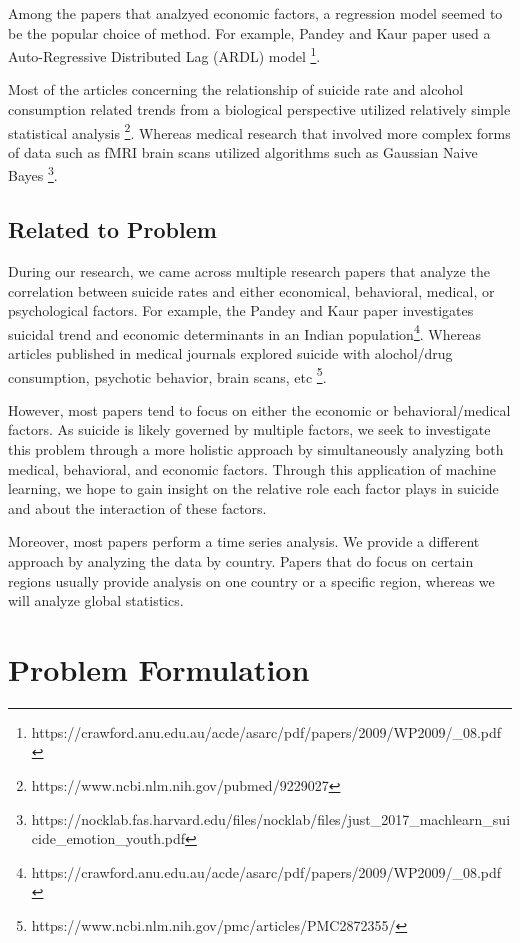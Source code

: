 \documentclass{article}
\begin{document}
\begin{multicols}{2}
Among the papers that analzyed economic factors, a regression model seemed to be the popular choice of method. For example, Pandey and Kaur paper used a Auto-Regressive Distributed Lag (ARDL) model \footnote{https://crawford.anu.edu.au/acde/asarc/pdf/papers/2009/WP2009/{\_}08.pdf}. 

Most of the articles concerning the relationship of suicide rate and alcohol consumption related trends from a biological perspective utilized relatively simple statistical analysis \footnote{https://www.ncbi.nlm.nih.gov/pubmed/9229027}. Whereas medical research that involved more complex forms of data such as fMRI brain scans utilized algorithms such as Gaussian Naive Bayes \footnote{https://nocklab.fas.harvard.edu/files/nocklab/files/just{\_}2017{\_}machlearn{\_}suicide{\_}emotion{\_}youth.pdf}.

\subsection{Related to Problem} 

During our research, we came across multiple research papers that analyze the correlation between suicide rates and either economical, behavioral, medical, or psychological factors. For example, the Pandey and Kaur paper investigates suicidal trend and economic determinants in an Indian population\footnote{https://crawford.anu.edu.au/acde/asarc/pdf/papers/2009/WP2009/{\_}08.pdf}. Whereas articles published in medical journals explored suicide with alochol/drug consumption, psychotic behavior, brain scans, etc \footnote{https://www.ncbi.nlm.nih.gov/pmc/articles/PMC2872355/}. 

However, most papers tend to focus on either the economic or behavioral/medical factors. As suicide is likely governed by multiple factors, we seek to investigate this problem through a more holistic approach by simultaneously analyzing both medical, behavioral, and economic factors. Through this application of machine learning, we hope to gain insight on the relative role each factor plays in suicide and about the interaction of these factors. 

Moreover, most papers perform a time series analysis. We provide a different approach by analyzing the data by country. Papers that do focus on certain regions usually provide analysis on one country or a specific region, whereas we will analyze global statistics. 


\section{Problem Formulation} 

\end{multicols}
\end{document}

